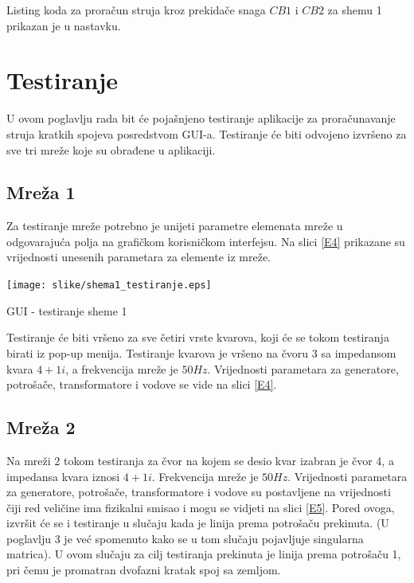 \documentclass[a4paper, 12pt]{article}
\numberwithin{figure}{section}
\numberwithin{equation}{section}
\begin{document}
Listing koda za proračun struja kroz prekidače snaga $CB1$ i $CB2$ za shemu 1 prikazan je u nastavku. \\















\newpage
\section{Testiranje}

U ovom poglavlju rada bit će pojašnjeno testiranje aplikacije za proračunavanje struja kratkih spojeva posredstvom GUI-a. Testiranje će biti odvojeno izvršeno za sve tri mreže koje su obrađene u aplikaciji.

\subsection{Mreža 1}

Za testiranje mreže potrebno je unijeti parametre elemenata mreže u odgovarajuća polja na grafičkom korisničkom interfejsu.  Na slici \ref{E4} prikazane su vrijednosti unesenih parametara za elemente iz mreže. 

\begin{center}
    \captionsetup{type=figure}
    \begin{center}
        \texttt{[image: slike/shema1\_testiranje.eps]}
        \caption{GUI - testiranje sheme 1}
        \label{E4}
    \end{center}
\end{center}

Testiranje će biti vršeno za sve četiri vrste kvarova, koji će se tokom testiranja birati iz pop-up menija. Testiranje kvarova je vršeno na čvoru 3 sa impedansom kvara $4+1i$, a frekvencija mreže je $50Hz$. Vrijednosti parametara za generatore, potrošače, transformatore i vodove se vide na slici \ref{E4}.

\subsection{Mreža 2}

Na mreži 2 tokom testiranja za čvor na kojem se desio kvar izabran je čvor 4, a impedansa kvara iznosi $4+1i$. Frekvencija mreže je $50Hz$. Vrijednosti parametara za generatore, potrošače, transformatore i vodove su postavljene na vrijednosti čiji red veličine ima fizikalni smisao i mogu se vidjeti na slici \ref{E5}. Pored ovoga, izvršit će se i testiranje u slučaju kada je linija prema potrošaču prekinuta. (U poglavlju 3 je već spomenuto kako se u tom slučaju pojavljuje singularna matrica). U ovom slučaju za cilj testiranja prekinuta je linija prema potrošaču 1, pri čemu je promatran dvofazni kratak spoj sa zemljom.
\end{document}
